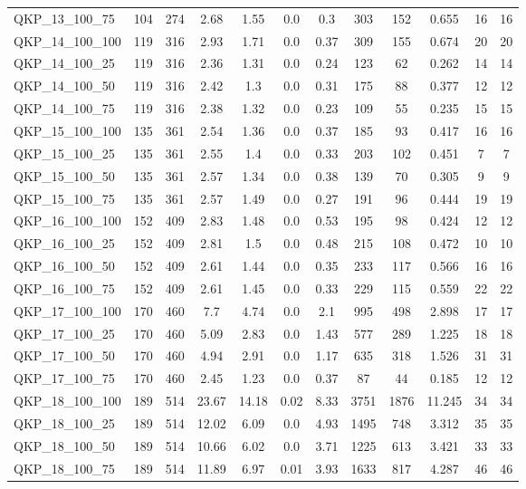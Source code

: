 \begin{table}[!h]
{\begin{tabular}{lccccccccccc}
QKP\_13\_100\_75 & 104 & 274 & 2.68 & 1.55 & 0.0 & 0.3 & 303 & 152 & 0.655 & 16 & 16\\
QKP\_14\_100\_100 & 119 & 316 & 2.93 & 1.71 & 0.0 & 0.37 & 309 & 155 & 0.674 & 20 & 20\\
QKP\_14\_100\_25 & 119 & 316 & 2.36 & 1.31 & 0.0 & 0.24 & 123 & 62 & 0.262 & 14 & 14\\
QKP\_14\_100\_50 & 119 & 316 & 2.42 & 1.3 & 0.0 & 0.31 & 175 & 88 & 0.377 & 12 & 12\\
QKP\_14\_100\_75 & 119 & 316 & 2.38 & 1.32 & 0.0 & 0.23 & 109 & 55 & 0.235 & 15 & 15\\
QKP\_15\_100\_100 & 135 & 361 & 2.54 & 1.36 & 0.0 & 0.37 & 185 & 93 & 0.417 & 16 & 16\\
QKP\_15\_100\_25 & 135 & 361 & 2.55 & 1.4 & 0.0 & 0.33 & 203 & 102 & 0.451 & 7 & 7\\
QKP\_15\_100\_50 & 135 & 361 & 2.57 & 1.34 & 0.0 & 0.38 & 139 & 70 & 0.305 & 9 & 9\\
QKP\_15\_100\_75 & 135 & 361 & 2.57 & 1.49 & 0.0 & 0.27 & 191 & 96 & 0.444 & 19 & 19\\
QKP\_16\_100\_100 & 152 & 409 & 2.83 & 1.48 & 0.0 & 0.53 & 195 & 98 & 0.424 & 12 & 12\\
QKP\_16\_100\_25 & 152 & 409 & 2.81 & 1.5 & 0.0 & 0.48 & 215 & 108 & 0.472 & 10 & 10\\
QKP\_16\_100\_50 & 152 & 409 & 2.61 & 1.44 & 0.0 & 0.35 & 233 & 117 & 0.566 & 16 & 16\\
QKP\_16\_100\_75 & 152 & 409 & 2.61 & 1.45 & 0.0 & 0.33 & 229 & 115 & 0.559 & 22 & 22\\
QKP\_17\_100\_100 & 170 & 460 & 7.7 & 4.74 & 0.0 & 2.1 & 995 & 498 & 2.898 & 17 & 17\\
QKP\_17\_100\_25 & 170 & 460 & 5.09 & 2.83 & 0.0 & 1.43 & 577 & 289 & 1.225 & 18 & 18\\
QKP\_17\_100\_50 & 170 & 460 & 4.94 & 2.91 & 0.0 & 1.17 & 635 & 318 & 1.526 & 31 & 31\\
QKP\_17\_100\_75 & 170 & 460 & 2.45 & 1.23 & 0.0 & 0.37 & 87 & 44 & 0.185 & 12 & 12\\
QKP\_18\_100\_100 & 189 & 514 & 23.67 & 14.18 & 0.02 & 8.33 & 3751 & 1876 & 11.245 & 34 & 34\\
QKP\_18\_100\_25 & 189 & 514 & 12.02 & 6.09 & 0.0 & 4.93 & 1495 & 748 & 3.312 & 35 & 35\\
QKP\_18\_100\_50 & 189 & 514 & 10.66 & 6.02 & 0.0 & 3.71 & 1225 & 613 & 3.421 & 33 & 33\\
QKP\_18\_100\_75 & 189 & 514 & 11.89 & 6.97 & 0.01 & 3.93 & 1633 & 817 & 4.287 & 46 & 46\\

\end{tabular}}
\end{table}
